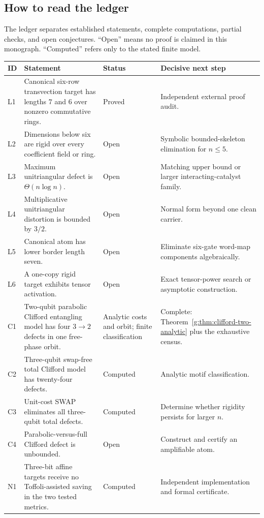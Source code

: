 \subsection{How to read the ledger}
The ledger separates established statements, complete computations, partial checks, and open conjectures.  ``Open'' means no proof is claimed in this monograph.  ``Computed'' refers only to the stated finite model.

\begin{longtable}{@{}>{\raggedright\arraybackslash}p{}>{\raggedright\arraybackslash}p{}>{\raggedright\arraybackslash}p{}>{\raggedright\arraybackslash}p{}@{}}
\toprule
ID & Statement & Status & Decisive next step\\
\midrule
L1 & Canonical six-row transvection target has lengths $7$ and $6$ over nonzero commutative rings. & Proved & Independent external proof audit.\\
L2 & Dimensions below six are rigid over every coefficient field or ring. & Open & Symbolic bounded-skeleton elimination for $n\le5$.\\
L3 & Maximum unitriangular defect is $\Theta(n\log n)$. & Open & Matching upper bound or larger interacting-catalyst family.\\
L4 & Multiplicative unitriangular distortion is bounded by $3/2$. & Open & Normal form beyond one clean carrier.\\
L5 & Canonical atom has lower border length seven. & Open & Eliminate six-gate word-map components algebraically.\\
L6 & A one-copy rigid target exhibits tensor activation. & Open & Exact tensor-power search or asymptotic construction.\\
C1 & Two-qubit parabolic Clifford entangling model has four $3\to2$ defects in one free-phase orbit. & Analytic costs and orbit; finite classification & Complete: Theorem~\ref{g:thm:clifford-two-analytic} plus the exhaustive census.\\
C2 & Three-qubit swap-free total Clifford model has twenty-four defects. & Computed & Analytic motif classification.\\
C3 & Unit-cost SWAP eliminates all three-qubit total defects. & Computed & Determine whether rigidity persists for larger $n$.\\
C4 & Parabolic-versus-full Clifford defect is unbounded. & Open & Construct and certify an amplifiable atom.\\
N1 & Three-bit affine targets receive no Toffoli-assisted saving in the two tested metrics. & Computed & Independent implementation and formal certificate.\\

\end{longtable}
